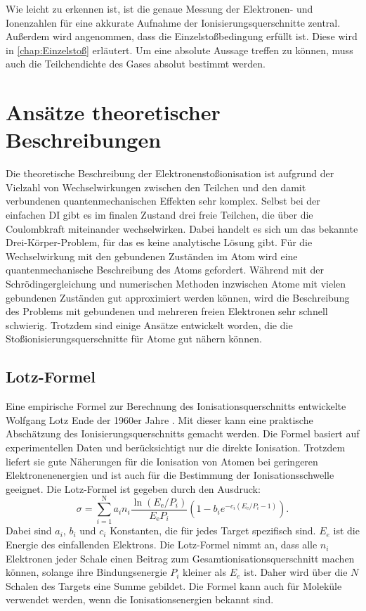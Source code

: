 Wie leicht zu erkennen ist, ist die genaue Messung der Elektronen- und Ionenzahlen für eine akkurate Aufnahme der Ionisierungsquerschnitte zentral. Außerdem wird angenommen, dass die Einzelstoßbedingung erfüllt ist. Diese wird in \ref{chap:Einzelstoß} erläutert. Um eine absolute Aussage treffen zu können, muss auch die Teilchendichte des Gases absolut bestimmt werden.


\section{Ansätze theoretischer Beschreibungen}
Die theoretische Beschreibung der Elektronenstoßionisation ist aufgrund der Vielzahl von Wechselwirkungen zwischen den Teilchen und den damit verbundenen quantenmechanischen Effekten sehr komplex. Selbst bei der einfachen DI gibt es im finalen Zustand drei freie Teilchen, die über die Coulombkraft miteinander wechselwirken. Dabei handelt es sich um das bekannte Drei-Körper-Problem, für das es keine analytische Lösung gibt. Für die Wechselwirkung mit den gebundenen Zuständen im Atom wird eine quantenmechanische Beschreibung des Atoms gefordert. Während mit der Schrödingergleichung und numerischen Methoden inzwischen Atome mit vielen gebundenen Zuständen gut approximiert werden können, wird die Beschreibung des Problems mit gebundenen und mehreren freien Elektronen sehr schnell schwierig. Trotzdem sind einige Ansätze entwickelt worden, die die Stoßionisierungsquerschnitte für Atome gut nähern können.

\subsection{Lotz-Formel}
Eine empirische Formel zur Berechnung des Ionisationsquerschnitts entwickelte Wolfgang Lotz Ende der 1960er Jahre \cite{Lotz}. Mit dieser kann eine praktische Abschätzung des Ionisierungsquerschnitts gemacht werden. Die Formel basiert auf experimentellen Daten und berücksichtigt nur die direkte Ionisation. Trotzdem liefert sie gute Näherungen für die Ionisation von Atomen bei geringeren Elektronenenergien und ist auch für die Bestimmung der Ionisationsschwelle geeignet. Die Lotz-Formel ist gegeben durch den Ausdruck:
\begin{equation}
    \sigma = \sum_{i=1}^{\text{N}} a_{i} n_{i} \frac{ \ln \left( E_{\text{e}} / P_{i} \right) }{ E_{\text{e}} P_{i} } \left( 1 - b_{i} e ^{-c_{i} \left( E_{\text{e}} / P_{i} - 1 \right)} \right).
\end{equation}
Dabei sind $a_i$, $b_i$ und $c_i$ Konstanten, die für jedes Target spezifisch sind. $E_e$ ist die Energie des einfallenden Elektrons. Die Lotz-Formel nimmt an, dass alle $n_i$ Elektronen jeder Schale einen Beitrag zum Gesamtionisationsquerschnitt machen können, solange ihre Bindungsenergie $P_i$ kleiner als $E_e$ ist. Daher wird über die $N$ Schalen des Targets eine Summe gebildet. Die Formel kann auch für Moleküle verwendet werden, wenn die Ionisationsenergien bekannt sind.

